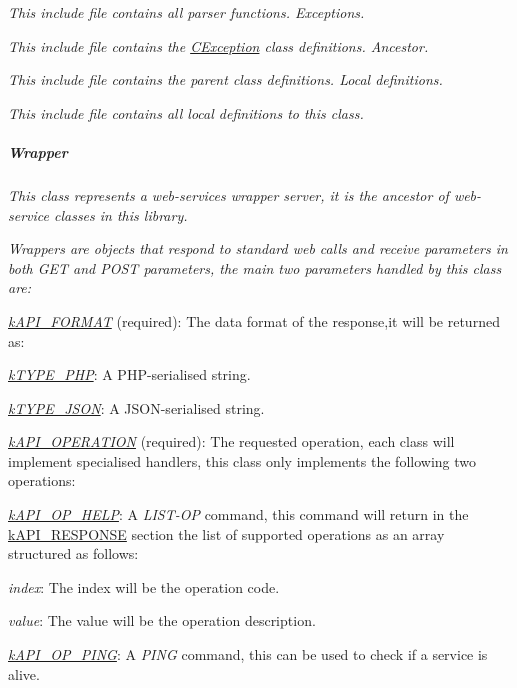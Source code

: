 {\itshape This include file contains all parser functions. Exceptions.}

{\itshape This include file contains the \hyperlink{class_c_exception}{C\-Exception} class definitions. Ancestor.}

{\itshape This include file contains the parent class definitions. Local definitions.}

{\itshape This include file contains all local definitions to this class. \subparagraph*{Wrapper}}

{\itshape }

{\itshape This class represents a web-\/services wrapper server, it is the ancestor of web-\/service classes in this library.}

{\itshape Wrappers are objects that respond to standard web calls and receive parameters in both {\itshape G\-E\-T} and {\itshape P\-O\-S\-T} parameters, the main two parameters handled by this class are\-:}

{\itshape 
\begin{DoxyItemize}
\item {\itshape \hyperlink{}{k\-A\-P\-I\-\_\-\-F\-O\-R\-M\-A\-T}} (required)\-: The data format of the response,it will be returned as\-: 
\begin{DoxyItemize}
\item {\itshape \hyperlink{}{k\-T\-Y\-P\-E\-\_\-\-P\-H\-P}}\-: A P\-H\-P-\/serialised string. 
\item {\itshape \hyperlink{}{k\-T\-Y\-P\-E\-\_\-\-J\-S\-O\-N}}\-: A J\-S\-O\-N-\/serialised string. 
\end{DoxyItemize}
\item {\itshape \hyperlink{}{k\-A\-P\-I\-\_\-\-O\-P\-E\-R\-A\-T\-I\-O\-N}} (required)\-: The requested operation, each class will implement specialised handlers, this class only implements the following two operations\-: 
\begin{DoxyItemize}
\item {\itshape \hyperlink{}{k\-A\-P\-I\-\_\-\-O\-P\-\_\-\-H\-E\-L\-P}}\-: A {\itshape L\-I\-S\-T-\/\-O\-P} command, this command will return in the \hyperlink{}{k\-A\-P\-I\-\_\-\-R\-E\-S\-P\-O\-N\-S\-E} section the list of supported operations as an array structured as follows\-: 
\begin{DoxyItemize}
\item {\itshape index}\-: The index will be the operation code. 
\item {\itshape value}\-: The value will be the operation description. 
\end{DoxyItemize}
\item {\itshape \hyperlink{}{k\-A\-P\-I\-\_\-\-O\-P\-\_\-\-P\-I\-N\-G}}\-: A {\itshape P\-I\-N\-G} command, this can be used to check if a service is alive. 
\end{DoxyItemize}
\end{DoxyItemize}}

